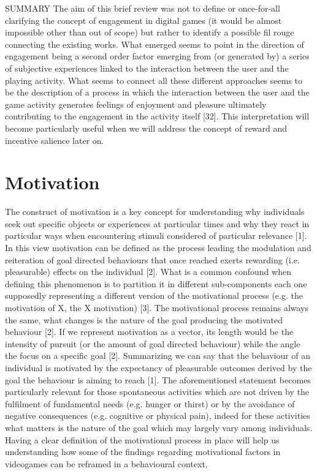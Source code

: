 SUMMARY
The aim of this brief review was not to define or once-for-all clarifying the concept of engagement in digital games (it would be almost impossible other than out of scope) but rather to identify a possible fil rouge connecting the existing works. What emerged seems to point in the direction of engagement being a second order factor emerging from (or generated by) a series of subjective experiences linked to the interaction between the user and the playing activity. What seems to connect all these different approaches seems to be the description of a process in which the interaction between the user and the game activity generates feelings of enjoyment and pleasure ultimately contributing to the engagement in the activity itself [32]. This interpretation will become particularly useful when we will address the concept of reward and incentive salience later on.

\section{Motivation}
\label{motivation}

The construct of motivation is a key concept for understanding why individuals seek out specific objects or experiences at particular times and why they react in particular ways when encountering stimuli considered of particular relevance [1]. In this view motivation can be defined as the process leading the modulation and reiteration of goal directed behaviours that once reached exerts rewarding (i.e. pleasurable) effects on the individual [2]. What is a common confound when defining this phenomenon is to partition it in different sub-components each one supposedly representing a different version of the motivational process (e.g. the motivation of X, the X motivation) [3]. The motivational process remains always the same, what changes is the nature of the goal producing the motivated behaviour [2]. If we represent motivation as a vector, its length would be the intensity of pursuit (or the amount of goal directed behaviour) while the angle the focus on a specific goal [2]. Summarizing we can say that the behaviour of an individual is motivated by the expectancy of pleasurable outcomes derived by the goal the behaviour is aiming to reach [1]. The aforementioned statement becomes particularly relevant for those spontaneous activities which are not driven by the fulfilment of fundamental needs (e.g. hunger or thirst) or by the avoidance of negative consequences (e.g. cognitive or physical pain), indeed for these activities what matters is the nature of the goal which may largely vary among individuals. Having a clear definition of the motivational process in place will help us understanding how some of the findings regarding motivational factors in videogames can be reframed in a behavioural context.

